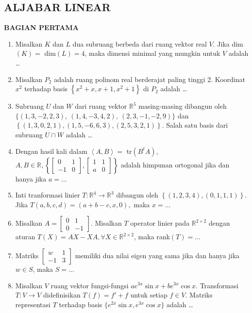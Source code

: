 \documentclass[12pt,twoside]{article}
\begin{document}
\subsection{ALJABAR LINEAR}
\textbf{BAGIAN PERTAMA}
\begin{enumerate}
	\item Misalkan $K$ dan $L$ dua subruang berbeda dari ruang vektor real $V$. Jika dim$(K)=$ dim$(L)=4$, maka dimensi minimal yang mungkin untuk $V$ adalah \dots

	\item Misalkan $P_2$ adalah ruang polinom real berderajat paling tinggi 2. Koordinat $x^2$ terhadap basis $\left\lbrace x^2+x,x+1,x^2+1 \right\rbrace$ di $P_2$ adalah \dots

	\item Subruang $U$ dan $W$ dari ruang vektor $\mathbb{R}^5$ masing-masing dibangun oleh \\$\big\{ (1,3,-2,2,3),~(1,4,-3,4,2),~(2,3,-1,-2,9)\big\}$ dan\\ $\left\lbrace (1,3,0,2,1),(1,5,-6,6,3),(2,5,3,2,1)\right\rbrace$. Salah satu basis dari subruang $U \cap W$ adalah \dots

	\item Dengan hasil kali dalam $\left< A,B \right> = $ tr$(B^tA)$, $A,B \in \mathbb{R}, \left\lbrace \left[ \begin{array}{cc}
				      0 & 1 \\-1&0
			      \end{array} \right], \left[ \begin{array}{cc}
				      1 & 1 \\a&0
			      \end{array} \right] \right\rbrace$ adalah himpunan ortogonal jika dan hanya jika $a = \dots$

	\item Inti tranformasi linier $T : \mathbb{R}^4 \to \mathbb{R}^3$ dibangun oleh $\left\lbrace (1,2,3,4),(0,1,1,1) \right\rbrace$. Jika $T(a,b,c,d) = (a+b-c,x,0),$ maka $x =\dots$

	\item Misalkan $A = \left[ \begin{array}{cc}
				      0 & 1 \\0&-1
			      \end{array} \right]$. Misalkan $T$ operator linier pada $\mathbb{R}^{2 \times 2}$ dengan aturan $T(X)=AX-XA, \forall X \in \mathbb{R}^{2 \times 2}$, maka rank$(T) =\dots$

	\item Matriks $\left[ \begin{array}{cc}
				      w & 1 \\-1&3
			      \end{array} \right]$ memiliki dua nilai eigen yang sama jika dan hanya jika $w \in S$, maka $S = \dots$

	\item Misalkan $V$ ruang vektor fungsi-fungsi $ae^{3x}\sin x + be^{3x}\cos x.$ Transformasi $T : V \to V$ didefinisikan $T(f)=f'+f$ untuk setiap $f \in V$. Matriks representasi $T$ terhadap basis $\{e^{2x}\sin x , e^{3x}\cos x\}$ adalah \dots
\end{enumerate}
\end{document}

